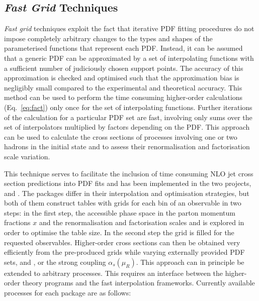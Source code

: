 \subsection{\emph{Fast Grid} Techniques}

  \emph{Fast grid} techniques exploit the fact that iterative PDF fitting
  procedures do not impose completely arbitrary changes to the types
  and shapes of the parameterised functions that represent each PDF\@.
  Instead, it can be assumed that a generic PDF can be approximated by
  a set of interpolating functions with a sufficient number of
 judiciously chosen support points. The 
  accuracy of this approximation is checked and optimised 
 such that the approximation bias is negligibly
  small compared to the experimental and theoretical accuracy. 
   This method can be used to perform
  the time consuming higher-order calculations (Eq.~\ref{eq:fact})
  only once for the set of interpolating functions. 
  Further iterations of the calculation for
  a particular PDF set are fast, involving only sums over
  the set of interpolators multiplied by factors depending on the
  PDF\@. This approach can be used to calculate the cross sections 
  of processes involving one or two hadrons in the initial state and to
  assess their renormalisation and factorisation scale variation.

  This technique serves to facilitate the inclusion of time consuming
  NLO jet cross section predictions into PDF fits and has been implemented
  in the two projects, \fastnlo \cite{Adloff:2000tq,Kluge:2006xs} 
  and \applgrid \cite{Carli:2005ji,Carli:2010rw}.
  The packages differ in their interpolation
  and optimisation strategies, but both of them construct tables with
  grids for each bin of an observable in two steps: in the first step,
  the accessible phase space in the parton momentum fractions $x$ and
  the renormalisation and factorisation scales \mur and \muf is
  explored in order to optimise the table size. In the second step
  the grid is filled for the
  requested observables. Higher-order cross sections can then be
  obtained very efficiently from the pre-produced grids while varying
  externally provided PDF sets, \mur and \muf, or the strong coupling
  $\alpha_s(\mu_R)$. This approach can in principle be extended to arbitrary
  processes. This requires an interface between the
  higher-order theory programs and the fast interpolation
  frameworks. Currently available processes for each package are as follows:

